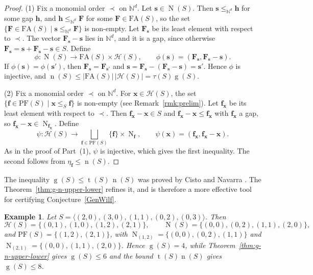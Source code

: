 \documentclass[12pt]{amsart}
\newcommand{\numberset}{\mathbb}
\newcommand{\N}{\numberset{N}}
\theoremstyle{plain}
\theoremstyle{theorem}
\newtheorem{example}[definition]{Example}
\theoremstyle{remark}
\begin{document}
\begin{proof}
(1) Fix a monomial order $\prec$ on $\N^d$. Let $\mathbf{s}\in \operatorname{N}(S)$. Then $\mathbf{s} \leq_{\mathbb{N}^d}  \mathbf{h}$ for some gap $\mathbf{h}$, and $\mathbf{h} \leq_{\mathbb{N}^d}  \mathbf{F}$ for some $\mathbf{F}\in\mathrm{FA}(S)$, so the set $\{\mathbf{F}\in\mathrm{FA}(S)\mid \mathbf{s}\leq_{\mathbb{N}^d} \mathbf{F}\}$ is non-empty. Let $\mathbf{F}_{\mathbf{s}}$ be its least element with respect to $\prec$. The vector $\mathbf{F}_{\mathbf{s}}-\mathbf{s}$ lies in $\N^d$, and it is a gap, since otherwise $\mathbf{F}_{\mathbf{s}}=\mathbf{s} + \mathbf{F}_{\mathbf{s}}-\mathbf{s}\in S$. Define
$$\phi\colon \operatorname{N}(S)\to\mathrm{FA}(S)\times \mathcal{H}(S),\qquad\phi(\mathbf{s})=(\mathbf{F}_{\mathbf{s}},\mathbf{F}_{\mathbf{s}}-\mathbf{s}).$$
If $\phi(\mathbf{s})=\phi(\mathbf{s}')$, then $\mathbf{F}_{\mathbf{s}}=\mathbf{F}_{\mathbf{s}'}$ and $\mathbf{s}=\mathbf{F}_{\mathbf{s}}-(\mathbf{F}_{\mathbf{s}}-\mathbf{s})=\mathbf{s}'$. Hence $\phi$ is injective, and $\operatorname{n}(S)\le|\mathrm{FA}(S)|\,|\mathcal{H}(S)|=\tau(S) \operatorname{g}(S)$.

(2) Fix a monomial order $\prec$ on $\N^d$. For $\mathbf{x}\in \mathcal{H}(S)$, the set $\{\mathbf{f}\in\mathrm{PF}(S)\mid \mathbf{x}\leq_S \mathbf{f}\}$ is non-empty (see Remark~\ref{rmk:prelim}). Let $\mathbf{f}_{\mathbf{x}}$ be its least element with respect to $\prec$. Then $\mathbf{f}_{\mathbf{x}}-\mathbf{x}\in S$ and $\mathbf{f}_{\mathbf{x}}-\mathbf{x}\leq \mathbf{f}_{\mathbf{x}}$ with $\mathbf{f}_{\mathbf{x}}$ a gap, so $\mathbf{f}_{\mathbf{x}}-\mathbf{x}\in \operatorname{N}_{\mathbf{f}_{\mathbf{x}}}$. Define
\[
\psi\colon \mathcal{H}(S)\to\bigsqcup_{\mathbf{f}\in\mathrm{PF}(S)}\{\mathbf{f}\}\times \operatorname{N}_{\mathbf{f}},\qquad\psi(\mathbf{x})=(\mathbf{f}_{\mathbf{x}},\mathbf{f}_{\mathbf{x}}-\mathbf{x}).
\]
As in the proof of Part~(1), $\psi$ is injective, which gives the first inequality. The second follows from $\eta_{\mathbf{f}}\leq \operatorname{n}(S)$.
\end{proof}

The inequality $\operatorname{g}(S)\le \operatorname{t}(S)\,\operatorname{n}(S)$ was proved by Cisto and Navarra \cite{Cisto-Navarra}. The Theorem~\ref{thm:g-n-upper-lower} refines it, and is therefore a more effective tool for certifying Conjecture~\ref{GenWilf}.

\begin{example}
Let $S=\langle(2,0),(3,0),(1,1),(0,2),(0,3)\rangle$. Then
\[
\mathcal{H}(S)=\{(0,1),(1,0),(1,2),(2,1)\},\qquad \operatorname{N}(S)=\{(0,0),(0,2),(1,1),(2,0)\},
\]
and $\mathrm{PF}(S)=\{(1,2),\allowbreak(2,1)\}$, with $\operatorname{N}_{(1,2)}=\{(0,0),\allowbreak(0,2),\allowbreak(1,1)\}$ and $\operatorname{N}_{(2,1)}=\{(0,0),\allowbreak(1,1),\allowbreak(2,0)\}$. Hence $\operatorname{g}(S)=4$, while Theorem~\ref{thm:g-n-upper-lower} gives $\operatorname{g}(S)\leq 6$ and the bound $\operatorname{t}(S)\operatorname{n}(S)$ gives $\operatorname{g}(S)\le8$.
\end{example}
\end{document}

